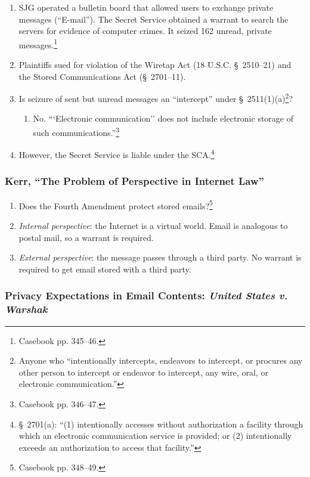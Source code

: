 \begin{enumerate}
    \item SJG operated a bulletin board that allowed users to exchange private 
    messages (``E-mail''). The Secret Service obtained a warrant to search the 
    servers for evidence of computer crimes. It seized 162 unread, private 
    messages.\footnote{Casebook pp. 345--46.}
    \item Plaintiffs sued for violation of the Wiretap Act (18 U.S.C. \S\ 
    2510--21) and the Stored Communications Act (\S\ 2701--11).
    \item Is seizure of sent but unread messages an ``intercept'' under \S\ 
    2511(1)(a)\footnote{Anyone who ``intentionally intercepts, endeavors to 
    intercept, or procures any other person to intercept or endeavor to 
    intercept, any wire, oral, or electronic communication.''}?
    \begin{enumerate}
        \item No. ```Electronic communication'' does not include electronic 
        storage of such communications.''\footnote{Casebook pp. 346--47.}
    \end{enumerate}
    \item However, the Secret Service is liable under the SCA.\footnote{\S\ 
    2701(a): ``(1) intentionally accesses without authorization a facility 
    through which an electronic communication service is provided; or (2) 
    intentionally exceeds an authorization to access that facility.''}
\end{enumerate}

\subsubsection{Kerr, ``The Problem of Perspective in Internet Law''}

\begin{enumerate}
    \item Does the Fourth Amendment protect stored emails?\footnote{Casebook 
    pp. 348--49.}
    \item \emph{Internal perspective}: the Internet is a virtual world. Email 
    is analogous to postal mail, so a warrant is required.
    \item \emph{External perspective}: the message passes through a third 
    party. No warrant is required to get email stored with a third party.
\end{enumerate}

\subsubsection{Privacy Expectations in Email Contents: \emph{United States v. 
Warshak}}

